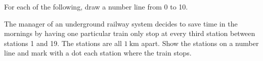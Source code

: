 \begin{exercises}
    \begin{questions}
        \Question[4] For each of the following, draw a number line from 0 to 10.
        \Question[2] The manager of an underground railway system decides to save time in the mornings by having one particular train only stop at every third station between stations 1 and 19. The stations are all \(1 \mathrm{~km}\) apart. Show the stations on a number line and mark with a dot each station where the train stops.
            \begin{solutionorbox}[2in]
            \end{solutionorbox}
    \end{questions}
\end{exercises}
